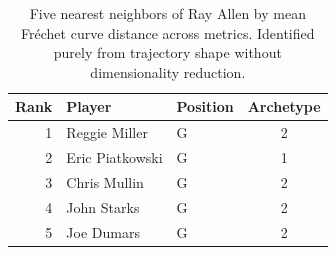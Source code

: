 \begin{table}[htbp]
  \centering\small
  \begin{tabular}{rllc}
    \toprule
    Rank & Player & Position & Archetype \\
    \midrule
    1 & Reggie Miller & G & 2 \\
    2 & Eric Piatkowski & G & 1 \\
    3 & Chris Mullin & G & 2 \\
    4 & John Starks & G & 2 \\
    5 & Joe Dumars & G & 2 \\
    \bottomrule
  \end{tabular}
  \caption{Five nearest neighbors of Ray Allen by mean Fr\'{e}chet curve distance across metrics. Identified purely from trajectory shape without dimensionality reduction.}
  \label{tab:Ray_Allen_frechet_curve_neighbors}
\end{table}

